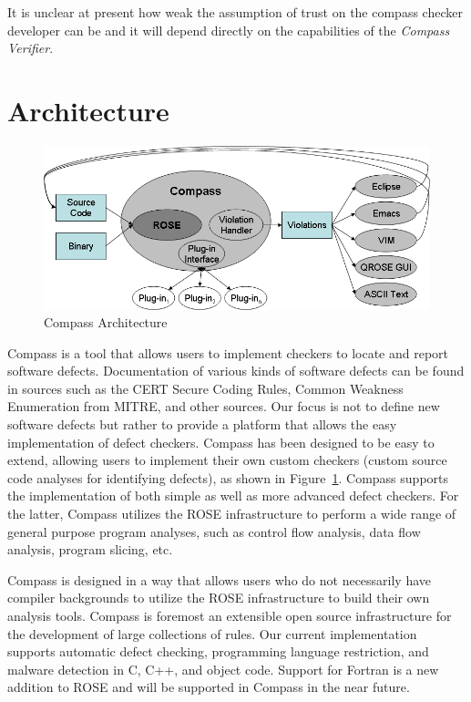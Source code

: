 It is unclear at present how weak the assumption of trust on the compass checker developer 
can be and it will depend directly on the capabilities of the \emph{Compass Verifier}.


\section{Architecture}

\begin{figure}[thb]
\includegraphics[width=6.0in]{compass_arc.png}
\caption{Compass Architecture}
\label{CompassArchitecture}
\end{figure}


Compass is a tool that allows users to implement checkers to locate and
report software defects.
Documentation of various kinds of software defects can be found in sources
such as the CERT Secure Coding Rules, Common Weakness Enumeration from MITRE, 
and other sources. Our focus is not to define new software defects but
rather to provide a platform that allows the easy implementation of defect
checkers.  Compass has been designed to be easy to extend, allowing users to 
implement their own custom checkers (custom source code analyses for
identifying defects), as shown in Figure~\ref{CompassArchitecture}. Compass supports
the implementation of both simple as well as more advanced defect
checkers. For the latter, Compass utilizes the ROSE infrastructure to
perform a wide range of general purpose program analyses, such as control
flow analysis, data flow analysis, program slicing, etc.


Compass is designed in a way that allows users who do not necessarily have
compiler backgrounds to utilize the ROSE infrastructure to build their
own analysis tools.
Compass is foremost an extensible open source infrastructure for the
development of large
collections of rules. Our current implementation supports automatic
defect checking, programming language restriction, and malware detection in
C, C++, and object code.
Support for Fortran is a new addition to ROSE and will be supported in
Compass in the near future.




